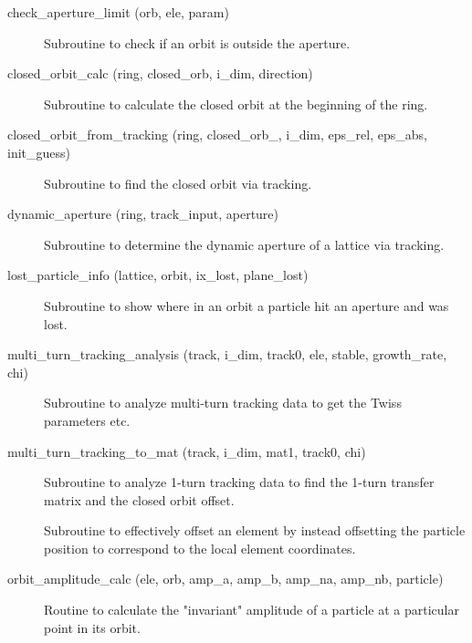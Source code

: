 \begin{description}

\item[check\_aperture\_limit (orb, ele, param)] \Newline
Subroutine to check if an orbit is outside the aperture. 

\item[closed\_orbit\_calc (ring, closed\_orb, i\_dim, direction)] \Newline 
Subroutine to calculate the closed orbit at the beginning of the ring.

\item[closed\_orbit\_from\_tracking (ring, closed\_orb\_, i\_dim, 
eps\_rel, eps\_abs, init\_guess)] \Newline
Subroutine to find the closed orbit via tracking. 

\item[dynamic\_aperture (ring, track\_input, aperture)] \Newline
Subroutine to determine the dynamic aperture of a lattice via tracking. 

\item[lost\_particle\_info (lattice, orbit, ix\_lost, plane\_lost)] \Newline 
Subroutine to show where in an orbit a particle hit an aperture and was lost.

\item[multi\_turn\_tracking\_analysis (track, i\_dim, track0, ele, 
stable, growth\_rate, chi)] \Newline
Subroutine to analyze multi-turn tracking data to get the Twiss
parameters etc.

\item[multi\_turn\_tracking\_to\_mat (track, i\_dim, 
mat1, track0, chi)] \Newline
Subroutine to analyze 1-turn tracking data to find the 1-turn transfer
matrix and the closed orbit offset.

\item[\protect\parbox{6in}{offset\_particle (ele, param, coord, set, 
set\_canonical, \\
\hspace*{2in} set\_tilt, set\_multipoles, set\_hvkicks, s\_pos)}] \Newline
Subroutine to effectively offset an element by instead offsetting 
the particle position to correspond to the local element coordinates. 

\item[orbit\_amplitude\_calc (ele, orb, amp\_a, amp\_b, amp\_na, amp\_nb, particle)] \Newline
Routine to calculate the "invariant" amplitude of a particle at a 
particular point in its orbit. 


\end{description}
